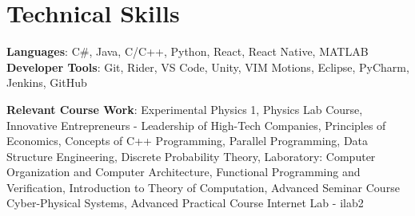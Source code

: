 \documentclass[letterpaper,11pt]{article}
\begin{document}
%
\section{Technical Skills}
 \begin{itemize}[leftmargin=0.15in, label={}]
    \small{\item{
     \textbf{Languages}{: C\#, Java, C/C++, Python, React, React Native, MATLAB} \\
     \textbf{Developer Tools}{: Git, Rider, VS Code, Unity, VIM Motions, Eclipse, PyCharm, Jenkins, GitHub} \\
    }}
    \textbf{Relevant Course Work}{: Experimental Physics 1, Physics Lab Course, Innovative Entrepreneurs - Leadership of High-Tech Companies, Principles of Economics, Concepts of C++ Programming, Parallel Programming, Data Structure Engineering, Discrete Probability Theory, Laboratory: Computer Organization and Computer Architecture, Functional Programming and Verification, Introduction to Theory of Computation, Advanced Seminar Course Cyber-Physical Systems, Advanced Practical Course Internet Lab - ilab2} \\
 \end{itemize}


\end{document}
